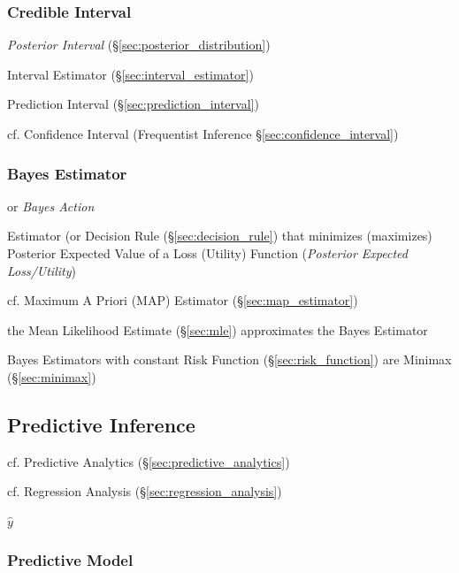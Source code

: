 \subsubsection{Credible Interval}\label{sec:credible_interval}

\emph{Posterior Interval} (\S\ref{sec:posterior_distribution})

Interval Estimator (\S\ref{sec:interval_estimator})

Prediction Interval (\S\ref{sec:prediction_interval})

cf. Confidence Interval (Frequentist Inference \S\ref{sec:confidence_interval})



\subsubsection{Bayes Estimator}\label{sec:bayes_estimator}\hfill

or \emph{Bayes Action}

Estimator (or Decision Rule (\S\ref{sec:decision_rule}) that minimizes
(maximizes) Posterior Expected Value of a Loss (Utility) Function
(\emph{Posterior Expected Loss/Utility})

cf. Maximum A Priori (MAP) Estimator (\S\ref{sec:map_estimator})

the Mean Likelihood Estimate (\S\ref{sec:mle}) approximates the Bayes Estimator

Bayes Estimators with constant Risk Function (\S\ref{sec:risk_function}) are
Minimax (\S\ref{sec:minimax})



\subsection{Predictive Inference}\label{sec:predictive_inference}

cf. Predictive Analytics (\S\ref{sec:predictive_analytics})

\fist cf. Regression Analysis (\S\ref{sec:regression_analysis})

$\hat{y}$



\subsubsection{Predictive Model}\label{sec:predictive_model}


